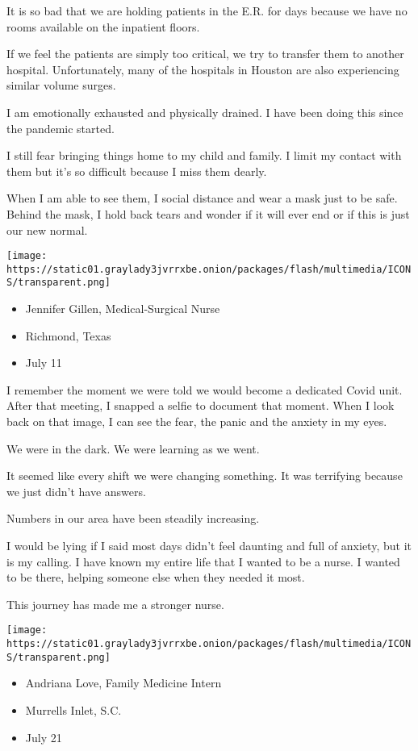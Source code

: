It is so bad that we are holding patients in the E.R. for days because
we have no rooms available on the inpatient floors.

If we feel the patients are simply too critical, we try to transfer them
to another hospital. Unfortunately, many of the hospitals in Houston are
also experiencing similar volume surges.

I am emotionally exhausted and physically drained. I have been doing
this since the pandemic started.

I still fear bringing things home to my child and family. I limit my
contact with them but it's so difficult because I miss them dearly.

When I am able to see them, I social distance and wear a mask just to be
safe. Behind the mask, I hold back tears and wonder if it will ever end
or if this is just our new normal.

\texttt{[image: https://static01.graylady3jvrrxbe.onion/packages/flash/multimedia/ICONS/transparent.png]}

\begin{itemize}
\tightlist
\item
  Jennifer Gillen, Medical-Surgical Nurse
\item
  Richmond, Texas
\item
  July 11
\end{itemize}

I remember the moment we were told we would become a dedicated Covid
unit. After that meeting, I snapped a selfie to document that moment.
When I look back on that image, I can see the fear, the panic and the
anxiety in my eyes.

We were in the dark. We were learning as we went.

It seemed like every shift we were changing something. It was terrifying
because we just didn't have answers.

Numbers in our area have been steadily increasing.

I would be lying if I said most days didn't feel daunting and full of
anxiety, but it is my calling. I have known my entire life that I wanted
to be a nurse. I wanted to be there, helping someone else when they
needed it most.

This journey has made me a stronger nurse.

\texttt{[image: https://static01.graylady3jvrrxbe.onion/packages/flash/multimedia/ICONS/transparent.png]}

\begin{itemize}
\tightlist
\item
  Andriana Love, Family Medicine Intern
\item
  Murrells Inlet, S.C.
\item
  July 21
\end{itemize}

